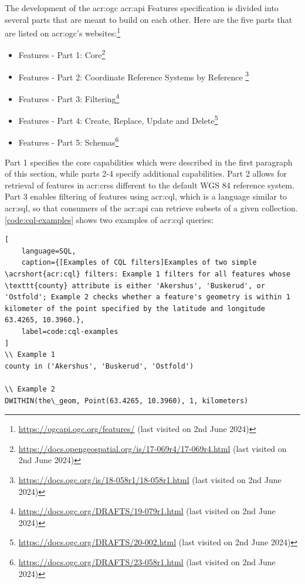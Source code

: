 The development of the \acrshort{acr:ogc} \acrshort{acr:api} Features specification is divided into several parts that are meant to build on each other. Here are the five parts that are listed on \acrshort{acr:ogc}'s websites:\footnote{\url{https://ogcapi.ogc.org/features/} (last visited on 2nd June 2024)}

\begin{itemize}
    \item Features - Part 1: Core\footnote{\url{https://docs.opengeospatial.org/is/17-069r4/17-069r4.html} (last visited on 2nd June 2024)}
    \item Features - Part 2: Coordinate Reference Systems by Reference \footnote{\url{https://docs.ogc.org/is/18-058r1/18-058r1.html} (last visited on 2nd June 2024)}
    \item Features - Part 3: Filtering\footnote{\url{https://docs.ogc.org/DRAFTS/19-079r1.html} (last visited on 2nd June 2024)}
    \item Features - Part 4: Create, Replace, Update and Delete\footnote{\url{https://docs.ogc.org/DRAFTS/20-002.html} (last visited on 2nd June 2024)}
    \item Features - Part 5: Schemas\footnote{\url{https://docs.ogc.org/DRAFTS/23-058r1.html} (last visited on 2nd June 2024)}
\end{itemize}

Part 1 specifies the core capabilities which were described in the first paragraph of this section, while parts 2-4 specify additional capabilities. Part 2 allows for retrieval of features in \glspl{acr:crs} different to the default WGS 84 reference system. Part 3 enables filtering of features using \gls{acr:cql}, which is a language similar to \acrshort{acr:sql}, so that consumers of the \acrshort{acr:api} can retrieve subsets of a given collection. \autoref{code:cql-examples} shows two examples of \gls{acr:cql} queries:

\begin{lstlisting}[
    language=SQL,
    caption={[Examples of CQL filters]Examples of two simple \acrshort{acr:cql} filters: Example 1 filters for all features whose \texttt{county} attribute is either 'Akershus', 'Buskerud', or 'Ostfold'; Example 2 checks whether a feature's geometry is within 1 kilometer of the point specified by the latitude and longitude 63.4265, 10.3960.},
    label=code:cql-examples
]
\\ Example 1
county in ('Akershus', 'Buskerud', 'Ostfold')

\\ Example 2
DWITHIN(the\_geom, Point(63.4265, 10.3960), 1, kilometers)
\end{lstlisting}

